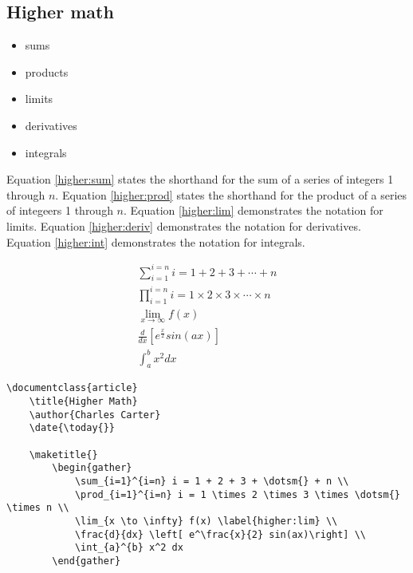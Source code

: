         \subsection{Higher math}
        \label{Higher math}
        
        \begin{framed}
            \begin{itemize}
                \item{sums}
                \item{products}
                \item{limits}
                \item{derivatives}
                \item{integrals}
            \end{itemize}
        \end{framed}

		Equation \ref{higher:sum} states the shorthand for the sum of a series of integers 1 through $n$. Equation \ref{higher:prod} states the shorthand for the product of a series of integeers 1 through $n$. Equation \ref{higher:lim} demonstrates the notation for limits. Equation \ref{higher:deriv} demonstrates the notation for derivatives. Equation \ref{higher:int} demonstrates the notation for integrals.

		\begin{gather}
			\sum_{i=1}^{i=n} i = 1 + 2 + 3 + \dotsm{} + n \label{higher:sum} \\
			\prod_{i=1}^{i=n} i = 1 \times 2 \times 3 \times \dotsm{} \times n \label{higher:prod} \\
			\lim_{x \to \infty} f(x) \label{higher:lim} \\
			\frac{d}{dx} \left[ e^\frac{x}{2} sin(ax)\right] \label{higher:deriv} \\
			\int_{a}^{b} x^2 dx \label{higher:int}
		\end{gather}
		

        \begin{verbatim}
\documentclass{article}
    \title{Higher Math}
    \author{Charles Carter}
    \date{\today{}}
 
    \maketitle{}
		\begin{gather}
			\sum_{i=1}^{i=n} i = 1 + 2 + 3 + \dotsm{} + n \\
			\prod_{i=1}^{i=n} i = 1 \times 2 \times 3 \times \dotsm{} \times n \\
			\lim_{x \to \infty} f(x) \label{higher:lim} \\
			\frac{d}{dx} \left[ e^\frac{x}{2} sin(ax)\right] \\
			\int_{a}^{b} x^2 dx
		\end{gather}
    
        \end{verbatim}

